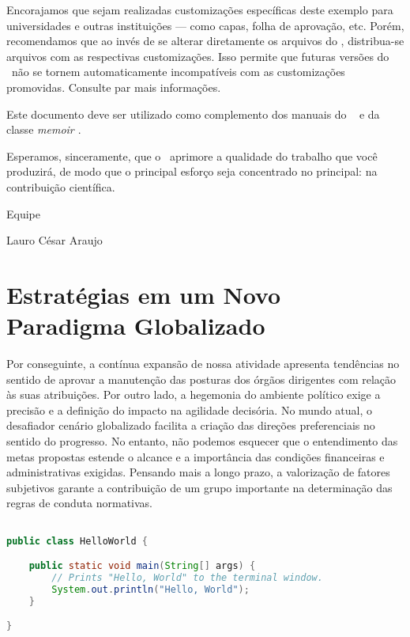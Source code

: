 Encorajamos que sejam realizadas customizações específicas deste exemplo para
universidades e outras instituições --- como capas, folha de aprovação, etc.
Porém, recomendamos que ao invés de se alterar diretamente os arquivos do
\abnTeX, distribua-se arquivos com as respectivas customizações.
Isso permite que futuras versões do \abnTeX~não se tornem automaticamente
incompatíveis com as customizações promovidas. Consulte
 par mais informações.

Este documento deve ser utilizado como complemento dos manuais do \abnTeX\ \cite{abntex2classe,abntex2cite,abntex2cite-alf} e da classe \emph{memoir \cite{memoir}}. 

Esperamos, sinceramente, que o \abnTeX\ aprimore a qualidade do trabalho que
você produzirá, de modo que o principal esforço seja concentrado no principal:
na contribuição científica.

Equipe \abnTeX 

Lauro César Araujo

\section{Estratégias em um Novo Paradigma Globalizado}
Por conseguinte, a contínua expansão de nossa atividade apresenta tendências no sentido de aprovar a manutenção das posturas dos órgãos dirigentes com relação às suas atribuições. Por outro lado, a hegemonia do ambiente político exige a precisão e a definição do impacto na agilidade decisória. No mundo atual, o desafiador cenário globalizado facilita a criação das direções preferenciais no sentido do progresso. No entanto, não podemos esquecer que o entendimento das metas propostas estende o alcance e a importância das condições financeiras e administrativas exigidas. Pensando mais a longo prazo, a valorização de fatores subjetivos garante a contribuição de um grupo importante na determinação das regras de conduta normativas. 

\begin{lstlisting}[caption={Primeiro código Java},label=Java1, language=java]

public class HelloWorld {

    public static void main(String[] args) {
        // Prints "Hello, World" to the terminal window.
        System.out.println("Hello, World");
    }

}

\end{lstlisting}

